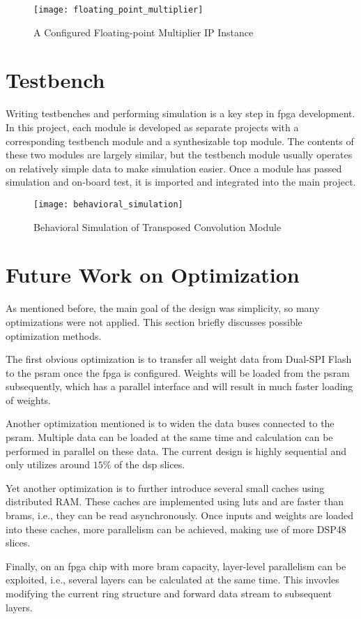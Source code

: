 \begin{figure}[h]
  \centering
  \texttt{[image: floating\_point\_multiplier]}
  \caption{A Configured Floating-point Multiplier IP Instance}
  \label{fig:floating_point_multiplier}
\end{figure}

\section{Testbench}

Writing testbenches and performing simulation is a key step in \gls{fpga} development. In this project,
each module is developed as separate projects with a corresponding testbench module and a synthesizable
top module. The contents of these two modules are largely similar, but the testbench module usually operates
on relatively simple data to make simulation easier. Once a module has passed simulation and on-board test,
it is imported and integrated into the main project.

\begin{figure}[h]
  \centering
  \texttt{[image: behavioral\_simulation]}
  \caption{Behavioral Simulation of Transposed Convolution Module}
  \label{fig:behavioral_simulation}
\end{figure}

\section{Future Work on Optimization}

As mentioned before, the main goal of the design was simplicity, so many optimizations were not applied.
This section briefly discusses possible optimization methods.

The first obvious optimization is to transfer all weight data from Dual-SPI Flash to the \gls{psram} once
the \gls{fpga} is configured. Weights will be loaded from the \gls{psram} subsequently, which has a parallel
interface and will result in much faster loading of weights.

Another optimization mentioned is to widen the data buses connected to the \gls{psram}. Multiple data
can be loaded at the same time and calculation can be performed in parallel on these data. The current
design is highly sequential and only utilizes around $15\%$ of the \gls{dsp} slices.

Yet another optimization is to further introduce several small caches using distributed RAM. These caches
are implemented using \glspl{lut} and are faster than \glspl{bram}, i.e., they can be read asynchronously.
Once inputs and weights are loaded into these caches, more parallelism can be achieved,
making use of more DSP48 slices.

Finally, on an \gls{fpga} chip with more \gls{bram} capacity, layer-level parallelism can be exploited, i.e.,
several layers can be calculated at the same time. This invovles modifying the current ring structure and
forward data stream to subsequent layers.

\clearpage %
